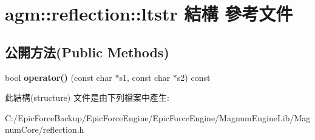 \hypertarget{structagm_1_1reflection_1_1ltstr}{}\section{agm\+:\+:reflection\+:\+:ltstr 結構 參考文件}
\label{structagm_1_1reflection_1_1ltstr}
\subsection*{公開方法(Public Methods)}
\begin{DoxyCompactItemize}
\item 
bool {\bfseries operator()} (const char $\ast$s1, const char $\ast$s2) const \hypertarget{structagm_1_1reflection_1_1ltstr_a3601696ad0ded09200b4b1adaea8176b}{}\label{structagm_1_1reflection_1_1ltstr_a3601696ad0ded09200b4b1adaea8176b}

\end{DoxyCompactItemize}


此結構(structure) 文件是由下列檔案中產生\+:\begin{DoxyCompactItemize}
\item 
C\+:/\+Epic\+Force\+Backup/\+Epic\+Force\+Engine/\+Epic\+Force\+Engine/\+Magnum\+Engine\+Lib/\+Magnum\+Core/reflection.\+h\end{DoxyCompactItemize}
